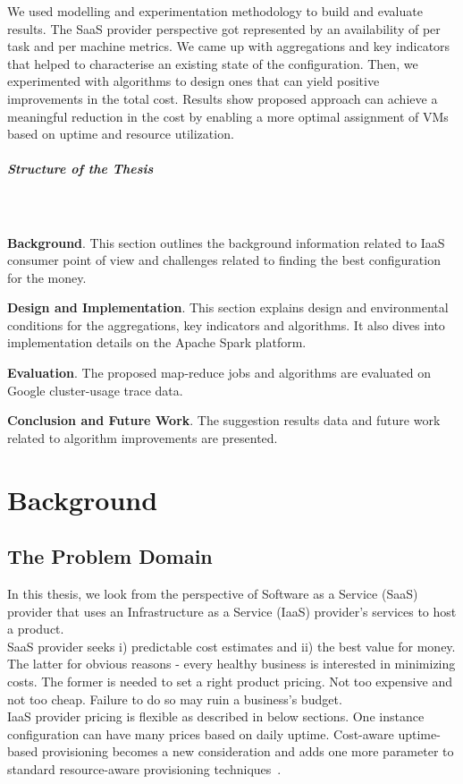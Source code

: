 \documentclass[]{final_report}
\newcommand{\myparagraph}[1]{\paragraph{#1}\mbox{}\\}
\begin{document}

We used modelling and experimentation methodology to build and evaluate results. The SaaS provider perspective got represented by an availability of per task and per machine metrics. We came up with aggregations and key indicators that helped to characterise an existing state of the configuration. Then, we experimented with algorithms to design ones that can yield positive improvements in the total cost.
Results show proposed approach can achieve a meaningful reduction in the cost by enabling a more optimal assignment of VMs based on uptime and resource utilization. 

\myparagraph{Structure of the Thesis}\\
\textbf{Background}. This section outlines the background information related to IaaS consumer point of view and challenges related to finding the best configuration for the money. \par
\textbf{Design and Implementation}. This section explains design and environmental conditions for the aggregations, key indicators and algorithms. It also dives into implementation details on the Apache Spark platform. \par
\textbf{Evaluation}. The proposed map-reduce jobs and algorithms are evaluated on Google cluster-usage trace data. \par
\textbf{Conclusion and Future Work}. The suggestion results data and future work related to algorithm improvements are presented. 
 
\newpage


\chapter{Background}

\section{The Problem Domain} 

In this thesis, we look from the perspective of Software as a Service (SaaS) provider that uses an Infrastructure as a Service (IaaS) provider's services to host a product. \\
SaaS provider seeks i) predictable cost estimates and ii) the best value for money. The latter for obvious reasons - every healthy business is interested in minimizing costs. The former is needed to set a right product pricing. Not too expensive and not too cheap. Failure to do so may ruin a business's budget. \\
IaaS provider pricing is flexible as described in below sections. One instance configuration can have many prices based on daily uptime. Cost-aware uptime-based provisioning becomes a new consideration and adds one more parameter to standard resource-aware provisioning techniques~\cite{Bartolini:2014:AFC:2658949.2637480}.
\end{document}
